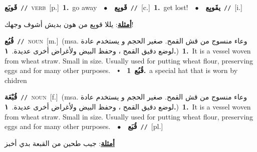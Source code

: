 \documentclass[10pt,a4paper,twoside]{article} %
\begin{document}
\begin{multicols}{2}
{\setlength\topsep{0pt}\textbf{\foreignlanguage{arabic}{قَوبَع}}\ {\color{gray}\texttt{//}\color{black}}\ \textsc{verb}\ [p.]\ \textbf{1.}~go away\ \ $\bullet$\ \ \setlength\topsep{0pt}\textbf{\foreignlanguage{arabic}{قَوبِع}}\ {\color{gray}\texttt{//}\color{black}}\ [c.]\ \textbf{1.}~get lost!\ \ $\bullet$\ \ \setlength\topsep{0pt}\textbf{\foreignlanguage{arabic}{يقَوبِع}}\ {\color{gray}\texttt{//}\color{black}}\ [i.]\  \begin{flushright}\color{gray}\foreignlanguage{arabic}{\textbf{\underline{\foreignlanguage{arabic}{أمثلة}}}: يللا قوبِع من هون بديش أشوف وجهك!}\end{flushright}\color{black}} \vspace{2mm}

{\setlength\topsep{0pt}\textbf{\foreignlanguage{arabic}{قُبُع}}\ {\color{gray}\texttt{//}\color{black}}\ \textsc{noun}\ [m.]\ \color{gray}(msa. \foreignlanguage{arabic}{وعاء منسوج من قش القمح. صغير الحجم و يستخدم عادة لوضع دقيق القمح ، وحفظ البيض ولأغراض أخرى عديدة.}~\foreignlanguage{arabic}{\textbf{١.}})\color{black}\ \textbf{1.}~It is a vessel woven from wheat straw. Small in size. Usually used for putting wheat flour, preserving eggs and for many other purposes.\ \ $\smblkdiamond$\ \ \setlength\topsep{0pt}\textbf{\foreignlanguage{arabic}{قُبُع}}\ \textbf{1.}~a special hat that is worn by chidren\ } \vspace{2mm}

{\setlength\topsep{0pt}\textbf{\foreignlanguage{arabic}{قُبْعَة}}\ {\color{gray}\texttt{//}\color{black}}\ \textsc{noun}\ [f.]\ \color{gray}(msa. \foreignlanguage{arabic}{وعاء منسوج من قش القمح. صغير الحجم و يستخدم عادة لوضع دقيق القمح ، وحفظ البيض ولأغراض أخرى عديدة.}~\foreignlanguage{arabic}{\textbf{١.}})\color{black}\ \textbf{1.}~It is a vessel woven from wheat straw. Small in size. Usually used for putting wheat flour, preserving eggs and for many other purposes.\ \ $\bullet$\ \ \setlength\topsep{0pt}\textbf{\foreignlanguage{arabic}{قُبَع}}\ {\color{gray}\texttt{//}\color{black}}\ [pl.]\  \begin{flushright}\color{gray}\foreignlanguage{arabic}{\textbf{\underline{\foreignlanguage{arabic}{أمثلة}}}: جيب طحين من القبعة بدي أخبز}\end{flushright}\color{black}} \vspace{2mm}


\end{multicols}
\end{document}
